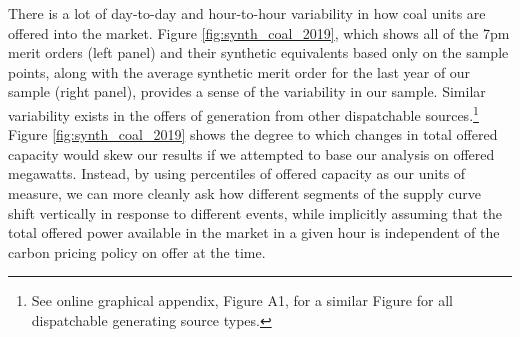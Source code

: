 \documentclass[12pt]{article}
\begin{document}
There is a lot of day-to-day and hour-to-hour variability in how coal units are offered into the market. Figure \ref{fig:synth_coal_2019}, which shows all of the 7pm merit orders (left panel) and their synthetic equivalents based only on the sample points, along with the average synthetic merit order for the last year of our sample (right panel), provides a sense of the variability in our sample. Similar variability exists in the offers of generation from other dispatchable sources.\footnote{See online graphical appendix, Figure A1, for a similar Figure for all dispatchable generating source types.} Figure \ref{fig:synth_coal_2019} shows the degree to which changes in total offered capacity would skew our results if we attempted to base our analysis on offered megawatts. Instead, by using percentiles of offered capacity as our units of measure, we can more cleanly ask how different segments of the supply curve shift vertically in response to different events, while implicitly assuming that the total offered power available in the market in a given hour is independent of the carbon pricing policy on offer at the time.
\end{document}
